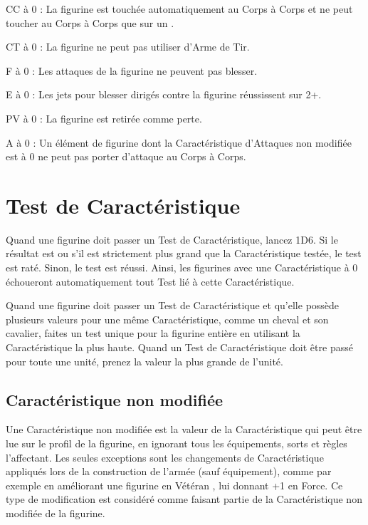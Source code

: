 \noindent CC à 0 : La figurine est touchée automatiquement au Corps à Corps et ne peut toucher au Corps à Corps que sur un .

\noindent CT à 0 : La figurine ne peut pas utiliser d'Arme de Tir.

\noindent F à 0 : Les attaques de la figurine ne peuvent pas blesser.

\noindent E à 0 : Les jets pour blesser dirigés contre la figurine réussissent sur 2+.

\noindent PV à 0 : La figurine est retirée comme perte.

\noindent A à 0 : Un élément de figurine dont la Caractéristique d'Attaques non modifiée est à 0 ne peut pas porter d'attaque au Corps à Corps.

\newpage
\section{Test de Caractéristique}

Quand une figurine doit passer un Test de Caractéristique, lancez 1D6. Si le résultat est  ou s'il est strictement plus grand que la Caractéristique testée, le test est raté. Sinon, le test est réussi. Ainsi, les figurines avec une Caractéristique à 0 échoueront automatiquement tout Test lié à cette Caractéristique.

Quand une figurine doit passer un Test de Caractéristique et qu'elle possède plusieurs valeurs pour une même Caractéristique, comme un cheval et son cavalier, faites un test unique pour la figurine entière en utilisant la Caractéristique la plus haute. Quand un Test de Caractéristique doit être passé pour toute une unité, prenez la valeur la plus grande de l'unité.

\subsection{Caractéristique non modifiée}
\label{unmodified_characteristics}

Une Caractéristique non modifiée est la valeur de la Caractéristique qui peut être lue sur le profil de la figurine, en ignorant tous les équipements, sorts et règles l'affectant. Les seules exceptions sont les changements de Caractéristique appliqués lors de la construction de l'armée (sauf équipement), comme par exemple en améliorant une figurine en \og Vétéran \fg{}, lui donnant +1 en Force. Ce type de modification est considéré comme faisant partie de la Caractéristique non modifiée de la figurine.

